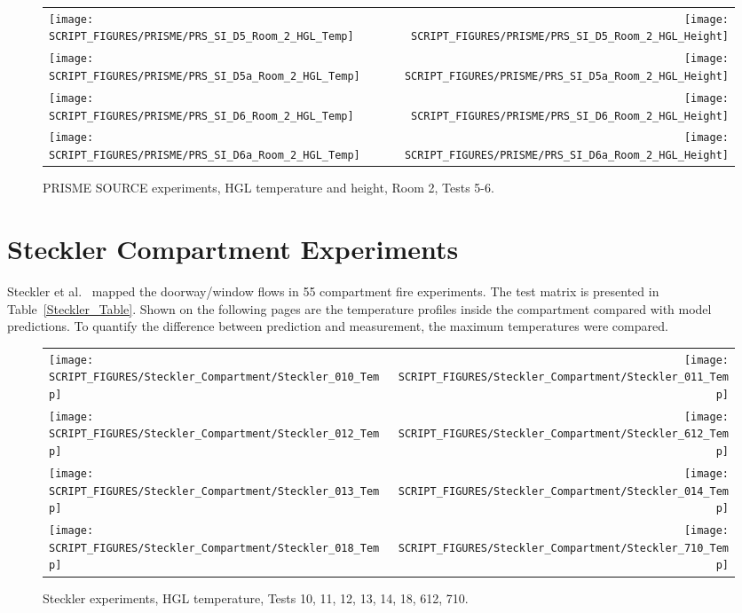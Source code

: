 \begin{figure}[!ht]
\begin{tabular*}{\textwidth}{l@{\extracolsep{\fill}}r}
\texttt{[image: SCRIPT\_FIGURES/PRISME/PRS\_SI\_D5\_Room\_2\_HGL\_Temp]} &
\texttt{[image: SCRIPT\_FIGURES/PRISME/PRS\_SI\_D5\_Room\_2\_HGL\_Height]} \\
\texttt{[image: SCRIPT\_FIGURES/PRISME/PRS\_SI\_D5a\_Room\_2\_HGL\_Temp]} &
\texttt{[image: SCRIPT\_FIGURES/PRISME/PRS\_SI\_D5a\_Room\_2\_HGL\_Height]} \\
\texttt{[image: SCRIPT\_FIGURES/PRISME/PRS\_SI\_D6\_Room\_2\_HGL\_Temp]} &
\texttt{[image: SCRIPT\_FIGURES/PRISME/PRS\_SI\_D6\_Room\_2\_HGL\_Height]} \\
\texttt{[image: SCRIPT\_FIGURES/PRISME/PRS\_SI\_D6a\_Room\_2\_HGL\_Temp]} &
\texttt{[image: SCRIPT\_FIGURES/PRISME/PRS\_SI\_D6a\_Room\_2\_HGL\_Height]}
\end{tabular*}
\caption[PRISME SOURCE experiments, HGL temperature and height, Room 2, Tests 5-6]
{PRISME SOURCE experiments, HGL temperature and height, Room 2, Tests 5-6.}
\label{PRISME_SI_HGL_2}
\end{figure}

\clearpage

\section{Steckler Compartment Experiments}

Steckler et al.~\cite{Steckler:NBSIR_82-2520} mapped the doorway/window flows in 55 compartment fire experiments. The test matrix is presented in Table~\ref{Steckler_Table}. Shown on the following pages are the temperature profiles inside the compartment compared with model predictions. To quantify the difference between prediction and measurement, the maximum temperatures were compared.

\newpage

\begin{figure}[p]
\begin{tabular*}{\textwidth}{l@{\extracolsep{\fill}}r}
\texttt{[image: SCRIPT\_FIGURES/Steckler\_Compartment/Steckler\_010\_Temp]} &
\texttt{[image: SCRIPT\_FIGURES/Steckler\_Compartment/Steckler\_011\_Temp]} \\
\texttt{[image: SCRIPT\_FIGURES/Steckler\_Compartment/Steckler\_012\_Temp]} &
\texttt{[image: SCRIPT\_FIGURES/Steckler\_Compartment/Steckler\_612\_Temp]} \\
\texttt{[image: SCRIPT\_FIGURES/Steckler\_Compartment/Steckler\_013\_Temp]} &
\texttt{[image: SCRIPT\_FIGURES/Steckler\_Compartment/Steckler\_014\_Temp]} \\
\texttt{[image: SCRIPT\_FIGURES/Steckler\_Compartment/Steckler\_018\_Temp]} &
\texttt{[image: SCRIPT\_FIGURES/Steckler\_Compartment/Steckler\_710\_Temp]}
\end{tabular*}
\caption[Steckler experiments, HGL temperature, Tests 10, 11, 12, 13, 14, 18, 612, 710]
{Steckler experiments, HGL temperature, Tests 10, 11, 12, 13, 14, 18, 612, 710.}
\label{Steckler_Temp_1}
\end{figure}


